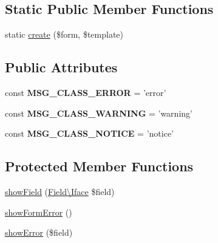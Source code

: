 \subsection*{Static Public Member Functions}
\begin{DoxyCompactItemize}
\item 
static \hyperlink{classTk_1_1Form_1_1Renderer_1_1Dom_1_1FormStatic_a7b1a3af58120ff31c17b1850aac02b88}{create} (\$form, \$template)
\end{DoxyCompactItemize}
\subsection*{Public Attributes}
\begin{DoxyCompactItemize}
\item 
\hypertarget{classTk_1_1Form_1_1Renderer_1_1Dom_1_1FormStatic_abbe112f1edcf7dad36cf1f66c001db91}{const {\bfseries M\+S\+G\+\_\+\+C\+L\+A\+S\+S\+\_\+\+E\+R\+R\+O\+R} = 'error'}\label{classTk_1_1Form_1_1Renderer_1_1Dom_1_1FormStatic_abbe112f1edcf7dad36cf1f66c001db91}

\item 
\hypertarget{classTk_1_1Form_1_1Renderer_1_1Dom_1_1FormStatic_adfb445497c1e2a0f13b567662abd6dd5}{const {\bfseries M\+S\+G\+\_\+\+C\+L\+A\+S\+S\+\_\+\+W\+A\+R\+N\+I\+N\+G} = 'warning'}\label{classTk_1_1Form_1_1Renderer_1_1Dom_1_1FormStatic_adfb445497c1e2a0f13b567662abd6dd5}

\item 
\hypertarget{classTk_1_1Form_1_1Renderer_1_1Dom_1_1FormStatic_a5a1563333aa5a577d12ead236bb52048}{const {\bfseries M\+S\+G\+\_\+\+C\+L\+A\+S\+S\+\_\+\+N\+O\+T\+I\+C\+E} = 'notice'}\label{classTk_1_1Form_1_1Renderer_1_1Dom_1_1FormStatic_a5a1563333aa5a577d12ead236bb52048}

\end{DoxyCompactItemize}
\subsection*{Protected Member Functions}
\begin{DoxyCompactItemize}
\item 
\hyperlink{classTk_1_1Form_1_1Renderer_1_1Dom_1_1FormStatic_ac051723d3350216c16cbee37cbe63b1f}{show\+Field} (\hyperlink{classTk_1_1Form_1_1Renderer_1_1Dom_1_1Field_1_1Iface}{Field\textbackslash{}\+Iface} \$field)
\item 
\hyperlink{classTk_1_1Form_1_1Renderer_1_1Dom_1_1FormStatic_a56ef6c567bcced44ee71ffdd7a6c22ec}{show\+Form\+Error} ()
\item 
\hyperlink{classTk_1_1Form_1_1Renderer_1_1Dom_1_1FormStatic_acfb647c4e2b1a98ed704dbf3e741010b}{show\+Error} (\$field)
\end{DoxyCompactItemize}
